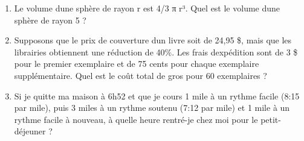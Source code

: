 \begin{enumerate}
\def\labelenumi{\arabic{enumi}.}
\tightlist
\item
  Le volume d\textquotesingle une sphère de rayon r est 4/3 π r³. Quel
  est le volume d\textquotesingle une sphère de rayon 5 ?
\item
  Supposons que le prix de couverture d\textquotesingle un livre soit de
  24,95 \$, mais que les librairies obtiennent une réduction de 40\%.
  Les frais d\textquotesingle expédition sont de 3 \$ pour le premier
  exemplaire et de 75 cents pour chaque exemplaire supplémentaire. Quel
  est le coût total de gros pour 60 exemplaires ?
\item
  Si je quitte ma maison à 6h52 et que je cours 1 mile à un rythme
  facile (8:15 par mile), puis 3 miles à un rythme soutenu (7:12 par
  mile) et 1 mile à un rythme facile à nouveau, à quelle heure rentré-je
  chez moi pour le petit-déjeuner ?
\end{enumerate}
